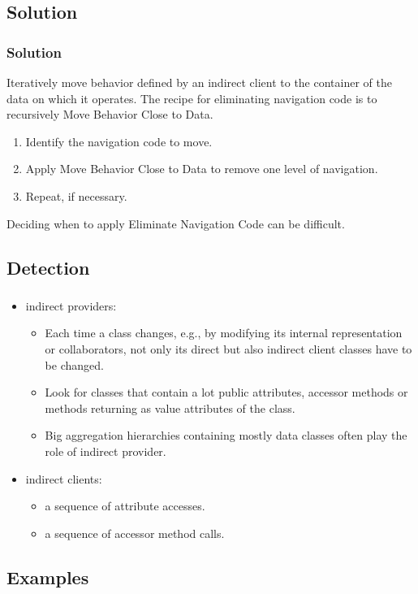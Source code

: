 \documentclass{beamer}
\begin{document}
\subsection{Solution}
\begin{frame}
\frametitle{Solution}
Iteratively move behavior defined by an indirect client to the container of the data on which it operates.
The recipe for eliminating navigation code is to recursively Move Behavior Close to Data.
\begin{enumerate}
\item Identify the navigation code to move.
\item Apply Move Behavior Close to Data to remove one level of navigation. 
\item Repeat, if necessary.
\end{enumerate}
Deciding when to apply Eliminate Navigation Code can be difficult.
\end{frame}

\subsection{Detection}
\begin{frame}
\frametitle{}
\begin{itemize}
\item indirect providers:
\begin{itemize}
\item Each time a class changes, e.g., by modifying its internal representation or collaborators, not only its direct but also indirect client classes have to be changed.
\item Look for classes that contain a lot public attributes, accessor methods or methods returning as value attributes of the class.
\item Big aggregation hierarchies containing mostly data classes often play the role of indirect provider.
\end{itemize}

\item indirect clients:
\begin{itemize}
\item a sequence of attribute accesses.
\item a sequence of accessor method calls.
\end{itemize}
\end{itemize}
\end{frame}

\subsection{Examples}
\begin{frame}
\frametitle{}
\end{frame}
\end{document}

